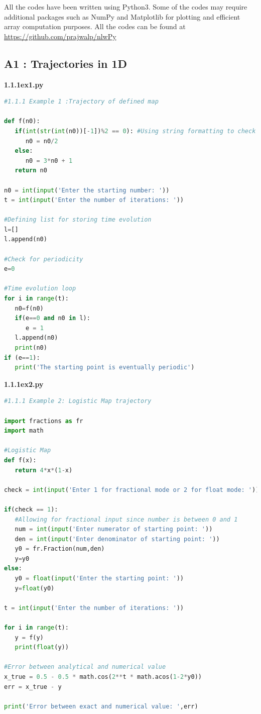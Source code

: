 \documentclass[11pt]{article}
\begin{document}
      All the codes have been written using Python3. Some of the codes may require additional packages such as NumPy and Matplotlib for plotting and efficient array computation purposes. All the codes can be found at \url{https://github.com/prajwalp/nlwPy}\\

      \subsection*{A1 : Trajectories in 1D}
      \textbf{1.1.1ex1.py}
      \begin{lstlisting}[backgroundcolor = \color{mygray},breaklines=true,language=Python]
#1.1.1 Example 1 :Trajectory of defined map

def f(n0):
   if(int(str(int(n0))[-1])%2 == 0): #Using string formatting to check if number is even
      n0 = n0/2
   else:
      n0 = 3*n0 + 1
   return n0

n0 = int(input('Enter the starting number: '))
t = int(input('Enter the number of iterations: '))

#Defining list for storing time evolution
l=[]
l.append(n0)

#Check for periodicity
e=0

#Time evolution loop
for i in range(t):
   n0=f(n0)
   if(e==0 and n0 in l):
      e = 1
   l.append(n0)
   print(n0)
if (e==1):
   print('The starting point is eventually periodic')
      \end{lstlisting}
      \vspace{10mm}
      \textbf{1.1.1ex2.py}
      \begin{lstlisting}[backgroundcolor = \color{mygray},breaklines=true,language=Python]
#1.1.1 Example 2: Logistic Map trajectory

import fractions as fr
import math

#Logistic Map
def f(x):
   return 4*x*(1-x)

check = int(input('Enter 1 for fractional mode or 2 for float mode: '))

if(check == 1):
   #Allowing for fractional input since number is between 0 and 1
   num = int(input('Enter numerator of starting point: '))
   den = int(input('Enter denominator of starting point: '))
   y0 = fr.Fraction(num,den)
   y=y0
else:
   y0 = float(input('Enter the starting point: '))
   y=float(y0)

t = int(input('Enter the number of iterations: '))

for i in range(t):
   y = f(y)
   print(float(y))

#Error between analytical and numerical value
x_true = 0.5 - 0.5 * math.cos(2**t * math.acos(1-2*y0))
err = x_true - y

print('Error between exact and numerical value: ',err)


      \end{lstlisting}
\end{document}
